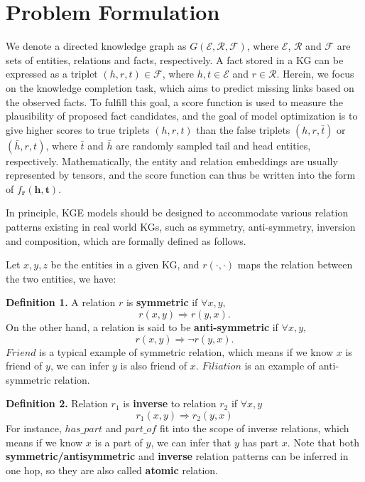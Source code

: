 \documentclass[11pt]{article}
\begin{document}
\section{Problem Formulation}

We denote a directed knowledge graph as \(G(\mathcal{E},\mathcal{R}, \mathcal{F})\), where \(\mathcal{E}\), \(\mathcal{R}\) and \(\mathcal{F}\) are sets of entities, relations and facts, respectively. A fact stored in a KG can be expressed as a triplet \((h, r, t) \in \mathcal{F}\), where \(h, t \in \mathcal{E}\) and \(r \in \mathcal{R}\). Herein, we focus on the knowledge completion task, which aims to predict missing links based on the observed facts. To fulfill this goal, a score function is used to measure the plausibility of proposed fact candidates, and the goal of model optimization is to give higher scores to true triplets \((h, r, t)\) than the false triplets \((h, r, \bar{t})\) or \((\bar{h}, r, t)\), where \(\bar{t}\) and \(\bar{h}\) are randomly sampled tail and head entities, respectively. Mathematically, the entity and relation embeddings are usually represented by tensors, and the score function can thus be written into the form of \(f_{\textbf{r}}(\textbf{h}, \textbf{t})\). 

In principle, KGE models should be designed to accommodate various relation patterns existing in real world KGs, such as symmetry, anti-symmetry, inversion and composition, which are formally defined as follows.





Let \(x, y, z\) be the entities in a given KG, and \(r(\cdot, \cdot)\) maps the relation between the two entities, we have:

{\textbf{Definition 1.} A relation \(r\) is \textbf{symmetric} if \(\forall x, y\),
\begin{equation}
r(x, y) \Rightarrow r(y, x).
\label{symmetric/anti-symmetry def}
\end{equation}
\noindent On the other hand, a relation is said to be \textbf{anti-symmetric} if \(\forall x, y\),
\begin{equation}
r(x, y) \Rightarrow \neg r(y, x).
\end{equation}}
\(Friend\) is a typical example of symmetric relation, which means if we know \(x\) is friend of \(y\), we can infer \(y\) is also friend of \(x\). \(Filiation\) is an example of anti-symmetric relation.


\textbf{Definition 2.} Relation \(r_1\) is \textbf{inverse} to relation \(r_2\) if \(\forall x, y\)
\begin{equation}
r_1(x, y) \Rightarrow r_2(y, x) 
\label{inverse_def_supp}
\end{equation}
For instance, \(has\_part\) and \(part\_of\) fit into the scope of inverse relations, which means if we know \(x\) is a part of \(y\), we can infer that \(y\) has part \(x\). Note that both \textbf{symmetric/antisymmetric} and \textbf{inverse} relation patterns can be inferred in one hop, so they are also called \textbf{atomic} relation.
\end{document}
